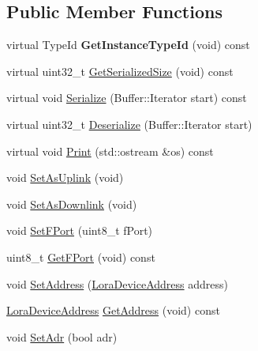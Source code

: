 \subsection*{Public Member Functions}
\begin{DoxyCompactItemize}
\item 
\mbox{\label{classns3_1_1lorawan_1_1LoraFrameHeader_aaedd3f371a6e3090b0dd88baaff19532}} 
virtual Type\+Id {\bfseries Get\+Instance\+Type\+Id} (void) const
\item 
virtual uint32\+\_\+t \hyperlink{classns3_1_1lorawan_1_1LoraFrameHeader_afa018a888ac159129f4ec309ff1c27fa}{Get\+Serialized\+Size} (void) const
\item 
virtual void \hyperlink{classns3_1_1lorawan_1_1LoraFrameHeader_a736fa7bd7de7cea2179784433f6c5adb}{Serialize} (Buffer\+::\+Iterator start) const
\item 
virtual uint32\+\_\+t \hyperlink{classns3_1_1lorawan_1_1LoraFrameHeader_acafb500a3b2c2a4b41d22ee984031b26}{Deserialize} (Buffer\+::\+Iterator start)
\item 
virtual void \hyperlink{classns3_1_1lorawan_1_1LoraFrameHeader_a2578ff0866c0af15bb5239ccbb0c7964}{Print} (std\+::ostream \&os) const
\item 
void \hyperlink{classns3_1_1lorawan_1_1LoraFrameHeader_a89181ba734f2b52ffc171d5d5f4ba123}{Set\+As\+Uplink} (void)
\item 
void \hyperlink{classns3_1_1lorawan_1_1LoraFrameHeader_aeeade331e76a7260c583a64706b3b4ec}{Set\+As\+Downlink} (void)
\item 
void \hyperlink{classns3_1_1lorawan_1_1LoraFrameHeader_af04f957858d8af6d72288cd44b557090}{Set\+F\+Port} (uint8\+\_\+t f\+Port)
\item 
uint8\+\_\+t \hyperlink{classns3_1_1lorawan_1_1LoraFrameHeader_ab859b1d3f527b8cb1b9f8b3e02b2c12d}{Get\+F\+Port} (void) const
\item 
void \hyperlink{classns3_1_1lorawan_1_1LoraFrameHeader_a65a8f5de3c705d18df13171c680e133f}{Set\+Address} (\hyperlink{classns3_1_1lorawan_1_1LoraDeviceAddress}{Lora\+Device\+Address} address)
\item 
\hyperlink{classns3_1_1lorawan_1_1LoraDeviceAddress}{Lora\+Device\+Address} \hyperlink{classns3_1_1lorawan_1_1LoraFrameHeader_af4f6f7e63f75b330293996a13adef033}{Get\+Address} (void) const
\item 
void \hyperlink{classns3_1_1lorawan_1_1LoraFrameHeader_a55264b1b0ff05231d142164a7b5a43b2}{Set\+Adr} (bool adr)

\end{DoxyCompactItemize}
